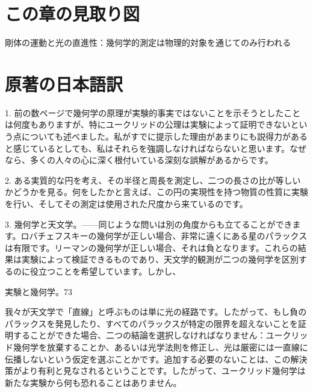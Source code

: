 \documentclass[a4paper,11pt,openany]{ltjsbook}
\begin{document}
\section*{この章の見取り図}
\begin{center}


\small 剛体の運動と光の直進性：幾何学的測定は物理的対象を通じてのみ行われる
\end{center}

\section{原著の日本語訳}
1. 前の数ページで幾何学の原理が実験的事実ではないことを示そうとしたことは何度もありますが、特にユークリッドの公理は実験によって証明できないという点についても述べました。私がすでに提示した理由があまりにも説得力があると感じているとしても、私はそれらを強調しなければならないと思います。なぜなら、多くの人々の心に深く根付いている深刻な誤解があるからです。

2. ある実質的な円を考え、その半径と周長を測定し、二つの長さの比が等しいかどうかを見る。何をしたかと言えば、この円の実現性を持つ物質の性質に実験を行い、そしてその測定は使用された尺度から来ているのです。

3. 幾何学と天文学。——同じような問いは別の角度からも立てることができます。ロバチェフスキーの幾何学が正しい場合、非常に遠くにある星のパラックスは有限です。リーマンの幾何学が正しい場合、それは負となります。これらの結果は実験によって検証できるものであり、天文学的観測が二つの幾何学を区別するのに役立つことを希望しています。しかし、

実験と幾何学。73

我々が天文学で「直線」と呼ぶものは単に光の経路です。したがって、もし負のパラックスを発見したり、すべてのパラックスが特定の限界を超えないことを証明することができた場合、二つの結論を選択しなければなりません：ユークリッド幾何学を放棄することか、あるいは光学法則を修正し、光は厳密には一直線に伝播しないという仮定を選ぶことかです。追加する必要のないことは、この解決策がより有利と見なされるということです。したがって、ユークリッド幾何学は新たな実験から何も恐れることはありません。
\end{document}

